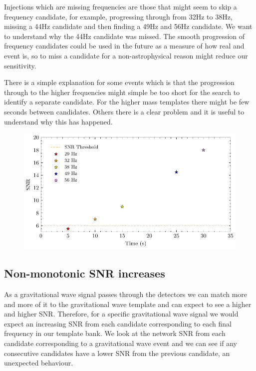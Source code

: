 Injections which are missing frequencies are those that might seem to skip a frequency candidate, for example, progressing through from 32Hz to 38Hz, missing a 44Hz candidate and then finding a 49Hz and 56Hz candidate. We want to understand why the 44Hz candidate was missed. The smooth progression of frequency candidates could be used in the future as a measure of how real and event is, so to miss a candidate for a non-astrophysical reason might reduce our sensitivity.

There is a simple explanation for some events which is that the progression through to the higher frequencies might simple be too short for the search to identify a separate candidate. For the higher mass templates there might be few seconds between candidates. Others there is a clear problem and it is useful to understand why this has happened.
%
\begin{figure}
       \centering
    \includegraphics[width=\textwidth]{images/6_earlywarning/identified-problems/missing_freqs.pdf}
    \caption{}
    \label{6:fig:missing_frequencies}
\end{figure}

\subsection{Non-monotonic SNR increases}

As a gravitational wave signal passes through the detectors we can match more and more of it to the gravitational wave template and can expect to see a higher and higher SNR. Therefore, for a specific gravitational wave signal we would expect an increasing SNR from each candidate corresponding to each final frequency in our template bank. We look at the network SNR from each candidate corresponding to a gravitational wave event and we can see if any consecutive candidates have a lower SNR from the previous candidate, an unexpected behaviour.


